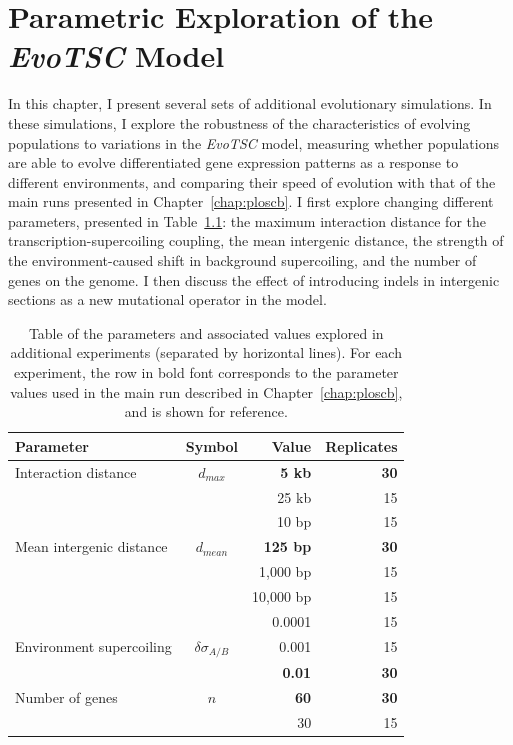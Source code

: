 \chapter{Parametric Exploration of the \emph{EvoTSC} Model}
\label{chap:param}

In this chapter, I present several sets of additional evolutionary simulations.
In these simulations, I explore the robustness of the characteristics of evolving populations to variations in the \emph{EvoTSC} model, measuring whether populations are able to evolve differentiated gene expression patterns as a response to different environments, and comparing their speed of evolution with that of the main runs presented in Chapter~\ref{chap:ploscb}.
I first explore changing different parameters, presented in Table~\ref{tab:param:params}: the maximum interaction distance for the transcription-supercoiling coupling, the mean intergenic distance, the strength of the environment-caused shift in background supercoiling, and the number of genes on the genome.
I then discuss the effect of introducing indels in intergenic sections as a new mutational operator in the model.

\begin{table}
\begin{center}
\begin{tabular}{l c r r}
\toprule
\textbf{Parameter} & \textbf{Symbol} & \textbf{Value} & \textbf{Replicates} \\
\midrule
Interaction distance & $d_{max}$ & \textbf{5 kb} & \textbf{30}\\
& & 25 kb & 15\\
\midrule
& & 10 bp& 15\\
Mean intergenic distance & $d_{mean}$ & \textbf{125 bp} & \textbf{30} \\
& & 1,000 bp & 15\\
& & 10,000 bp & 15 \\
\midrule
& & 0.0001 & 15\\
Environment supercoiling & $\delta\sigma_{A/B}$ & 0.001 & 15\\
& & \textbf{0.01} & \textbf{30}\\
\midrule
Number of genes & $n$ & \textbf{60} & \textbf{30} \\
& & 30 & 15 \\
\bottomrule
\end{tabular}
\end{center}
\caption[Table of parameter values explored in additional \emph{EvoTSC} simulations]{Table of the parameters and associated values explored in additional experiments (separated by horizontal lines).
For each experiment, the row in bold font corresponds to the parameter values used in the main run described in Chapter~\ref{chap:ploscb}, and is shown for reference.}
\label{tab:param:params}
\end{table}

